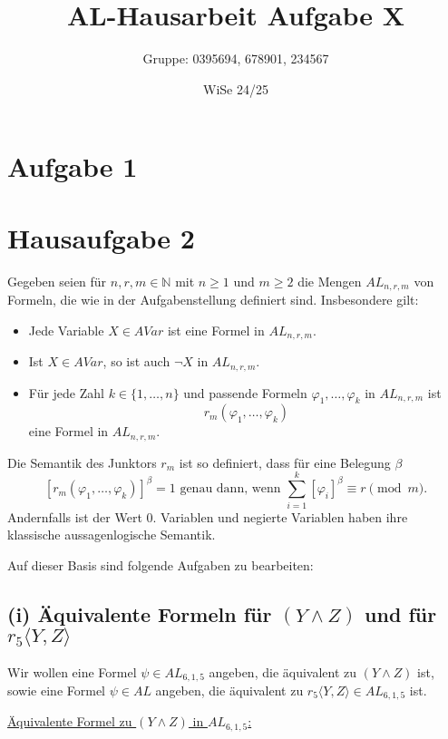 \documentclass[12pt,a4paper]{article}
\title{AL-Hausarbeit Aufgabe X}
\author{Gruppe: 0395694, 678901, 234567}
\date{WiSe 24/25}
\begin{document}
\maketitle

\section*{Aufgabe 1}

\section*{Hausaufgabe 2}

\noindent
Gegeben seien für $n,r,m \in \mathbb{N}$ mit $n \ge 1$ und $m \ge 2$ die Mengen $AL_{n,r,m}$ von Formeln, die wie in der Aufgabenstellung definiert sind. Insbesondere gilt:
\begin{itemize}
    \item Jede Variable $X \in AVar$ ist eine Formel in $AL_{n,r,m}$.
    \item Ist $X \in AVar$, so ist auch $\neg X$ in $AL_{n,r,m}$.
    \item Für jede Zahl $k \in \{1,\ldots,n\}$ und passende Formeln $\varphi_1,\ldots,\varphi_k$ in $AL_{n,r,m}$ ist 
    \[
    r_m(\varphi_1,\ldots,\varphi_k)
    \]
    eine Formel in $AL_{n,r,m}$.
\end{itemize}

Die Semantik des Junktors $r_m$ ist so definiert, dass für eine Belegung $\beta$ 
\[
[r_m(\varphi_1,\ldots,\varphi_k)]^\beta = 1 \text{ genau dann, wenn } \sum_{i=1}^k [\varphi_i]^\beta \equiv r \pmod{m}.
\]
Andernfalls ist der Wert 0. Variablen und negierte Variablen haben ihre klassische aussagenlogische Semantik.

Auf dieser Basis sind folgende Aufgaben zu bearbeiten:

\subsection*{(i) Äquivalente Formeln für $(Y \land Z)$ und für $r_5 \langle Y, Z \rangle$}

Wir wollen eine Formel $\psi \in AL_{6,1,5}$ angeben, die äquivalent zu $(Y \land Z)$ ist, sowie eine Formel $\psi \in AL$ angeben, die äquivalent zu $r_5\langle Y,Z \rangle \in AL_{6,1,5}$ ist.

\underline{Äquivalente Formel zu $(Y \land Z)$ in $AL_{6,1,5}$:}
\end{document}
